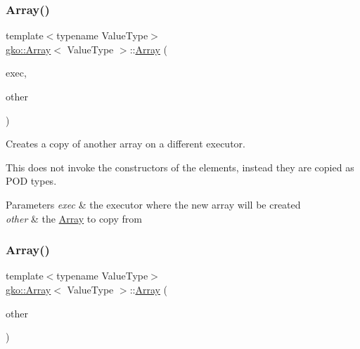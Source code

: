 \subsubsection{\texorpdfstring{Array()}{Array()}\hspace{0.1cm}{\footnotesize\ttfamily [8/11]}}
{\footnotesize\ttfamily template$<$typename Value\+Type$>$ \\
\hyperlink{classgko_1_1Array}{gko\+::\+Array}$<$ Value\+Type $>$\+::\hyperlink{classgko_1_1Array}{Array} (\begin{DoxyParamCaption}\item[{std\+::shared\+\_\+ptr$<$ const \hyperlink{classgko_1_1Executor}{Executor} $>$}]{exec,  }\item[{const \hyperlink{classgko_1_1Array}{Array}$<$ Value\+Type $>$ \&}]{other }\end{DoxyParamCaption})\hspace{0.3cm}{\ttfamily [inline]}}



Creates a copy of another array on a different executor. 

This does not invoke the constructors of the elements, instead they are copied as P\+OD types.


\begin{DoxyParams}{Parameters}
{\em exec} & the executor where the new array will be created \\
\hline
{\em other} & the \hyperlink{classgko_1_1Array}{Array} to copy from \\
\hline
\end{DoxyParams}
\mbox{\label{classgko_1_1Array_ab5c0cdf59d9920d0f72f4018a5e4a8ab}} 
\subsubsection{\texorpdfstring{Array()}{Array()}\hspace{0.1cm}{\footnotesize\ttfamily [9/11]}}
{\footnotesize\ttfamily template$<$typename Value\+Type$>$ \\
\hyperlink{classgko_1_1Array}{gko\+::\+Array}$<$ Value\+Type $>$\+::\hyperlink{classgko_1_1Array}{Array} (\begin{DoxyParamCaption}\item[{const \hyperlink{classgko_1_1Array}{Array}$<$ Value\+Type $>$ \&}]{other }\end{DoxyParamCaption})\hspace{0.3cm}{\ttfamily [inline]}}



